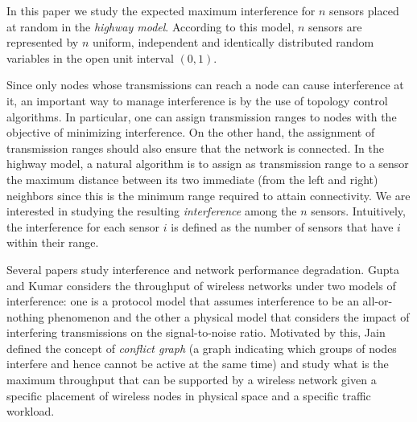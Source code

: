 \documentclass{patmorin}
\begin{document}
In this paper we study the expected maximum interference 
for $n$ sensors placed at random in the
{\em highway model}.
According to this model,
$n$ sensors are represented by $n$ uniform, independent and identically
distributed random variables
in the open unit interval $(0,1)$.

Since only nodes whose transmissions can reach a node can cause interference
at it, an important way to manage interference is by the use of topology control algorithms. In particular, one can assign transmission ranges to nodes with the objective of minimizing interference. On the other hand, the assignment of transmission ranges should also ensure that the network is connected. 
In the highway model, a natural algorithm is 
to assign as transmission range to a sensor the maximum distance
between its two immediate (from the left and right) neighbors since this
is the minimum range required to attain connectivity. 
We are interested in studying the resulting {\em interference} among the
$n$ sensors. 
Intuitively, the interference for each sensor $i$ is defined 
as the number of sensors that have $i$ within their
range. 



Several papers study interference and network performance degradation.
Gupta and Kumar \cite{gupta2000} 
considers the throughput of wireless networks under two models of
interference: one is a protocol model that assumes interference
to be an all-or-nothing phenomenon and the other a physical model
that considers the impact of interfering transmissions on
the signal-to-noise ratio.
Motivated by this, 
Jain \etal\ \cite{jain2005} defined the concept of
{\em conflict graph} (a graph indicating which groups of nodes
interfere and hence cannot be active at the same time) and study what is the maximum 
throughput that can be supported by a wireless network given a
specific placement of wireless nodes in physical space     
and a specific traffic workload.
\end{document}
